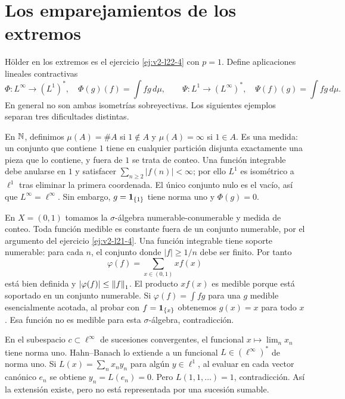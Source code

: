 \section{Los emparejamientos de los extremos}\label{lectura:v2-23}
Hölder en los extremos es el ejercicio \ref{ej:v2-l22-4} con $p=1$. Define aplicaciones lineales contractivas
\[
 \Phi:L^\infty\longrightarrow(L^1)^*,\quad\Phi(g)(f)=\int fg\,d\mu,
 \qquad
 \Psi:L^1\longrightarrow(L^\infty)^*,\quad\Psi(f)(g)=\int fg\,d\mu.
\]
En general no son ambas isometrías sobreyectivas. Los siguientes ejemplos separan tres dificultades distintas.
\begin{ejemplo}
En $\mathbb N$, definimos $\mu(A)=\#A$ si $1\notin A$ y $\mu(A)=\infty$ si $1\in A$. Es una medida: un conjunto que contiene $1$ tiene en cualquier partición disjunta exactamente una pieza que lo contiene, y fuera de $1$ se trata de conteo. Una función integrable debe anularse en $1$ y satisfacer $\sum_{n\ge2}|f(n)|<\infty$; por ello $L^1$ es isométrico a $\ell^1$ tras eliminar la primera coordenada. El único conjunto nulo es el vacío, así que $L^\infty=\ell^\infty$. Sin embargo, $g=\mathbf1_{\{1\}}$ tiene norma uno y $\Phi(g)=0$.
\end{ejemplo}
\begin{ejemplo}
En $X=(0,1)$ tomamos la $\sigma$-álgebra numerable-conumerable y medida de conteo. Toda función medible es constante fuera de un conjunto numerable, por el argumento del ejercicio \ref{ej:v2-l21-4}. Una función integrable tiene soporte numerable: para cada $n$, el conjunto donde $|f|\ge1/n$ debe ser finito. Por tanto
\[
 \varphi(f)=\sum_{x\in(0,1)}x f(x)
\]
está bien definida y $|\varphi(f)|\le\left\lVert f\right\rVert_1$. El producto $x f(x)$ es medible porque está soportado en un conjunto numerable. Si $\varphi(f)=\int fg$ para una $g$ medible esencialmente acotada, al probar con $f=\mathbf1_{\{x\}}$ obtenemos $g(x)=x$ para todo $x$. Esa función no es medible para esta $\sigma$-álgebra, contradicción.
\end{ejemplo}
\begin{ejemplo}\label{v2:limite-extendido}
En el subespacio $c\subset\ell^\infty$ de sucesiones convergentes, el funcional $x\mapsto\lim_nx_n$ tiene norma uno. Hahn--Banach lo extiende a un funcional $L\in(\ell^\infty)^*$ de norma uno. Si $L(x)=\sum_nx_ny_n$ para algún $y\in\ell^1$, al evaluar en cada vector canónico $e_n$ se obtiene $y_n=L(e_n)=0$. Pero $L(1,1,\ldots)=1$, contradicción. Así la extensión existe, pero no está representada por una sucesión sumable.
\end{ejemplo}

